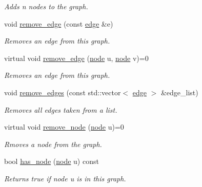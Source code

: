 \begin{DoxyCompactItemize}
\begin{DoxyCompactList}\small\item\em Adds {\itshape n} nodes to the graph. \end{DoxyCompactList}\item 
void \hyperlink{classlgraph_1_1xxgraph_a46a75fa2a10a8674ab930e9dc766e2f9}{remove\+\_\+edge} (const \hyperlink{namespacelgraph_a76bd7d50719f03de7a85db259d80d572}{edge} \&e)
\begin{DoxyCompactList}\small\item\em Removes an edge from this graph. \end{DoxyCompactList}\item 
virtual void \hyperlink{classlgraph_1_1xxgraph_a7fd3a1309cde4f408c8d9d4cb3b898a8}{remove\+\_\+edge} (\hyperlink{namespacelgraph_a397169dd66adf725210a30fb7251773e}{node} u, \hyperlink{namespacelgraph_a397169dd66adf725210a30fb7251773e}{node} v)=0
\begin{DoxyCompactList}\small\item\em Removes an edge from this graph. \end{DoxyCompactList}\item 
void \hyperlink{classlgraph_1_1xxgraph_aef7c4bf62f3f4db362b2d3accb3b6d3d}{remove\+\_\+edges} (const std\+::vector$<$ \hyperlink{namespacelgraph_a76bd7d50719f03de7a85db259d80d572}{edge} $>$ \&edge\+\_\+list)
\begin{DoxyCompactList}\small\item\em Removes all edges taken from a list. \end{DoxyCompactList}\item 
virtual void \hyperlink{classlgraph_1_1xxgraph_a5b9e033f38a3ab34734be61aa9344c84}{remove\+\_\+node} (\hyperlink{namespacelgraph_a397169dd66adf725210a30fb7251773e}{node} u)=0
\begin{DoxyCompactList}\small\item\em Rmoves a node from the graph. \end{DoxyCompactList}\item 
\mbox{\label{classlgraph_1_1xxgraph_a24645831355480e05f8e7ba75a5348c8}} 
bool \hyperlink{classlgraph_1_1xxgraph_a24645831355480e05f8e7ba75a5348c8}{has\+\_\+node} (\hyperlink{namespacelgraph_a397169dd66adf725210a30fb7251773e}{node} u) const
\begin{DoxyCompactList}\small\item\em Returns true if node {\itshape u} is in this graph. \end{DoxyCompactList}\item 

\end{DoxyCompactItemize}
